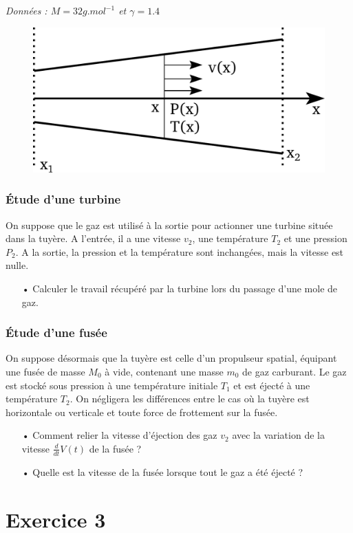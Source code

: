 \documentclass{report}
\begin{document}
\textit{Données : $M = 32g.mol^{-1}$ et $\gamma=1.4$}

\begin{figure}[!h]
\centering
\includegraphics[width=0.4\linewidth]{turbine.pdf}
\end{figure}

\subsubsection*{Étude d'une turbine}
On suppose que le gaz est utilisé à la sortie pour actionner une turbine située dans la tuyère. A l'entrée, il a une vitesse $v_{2}$, une température $T_{2}$ et une pression $P_{2}$. A la sortie, la pression et la température sont inchangées, mais la vitesse est nulle. 
\begin{itemize}
\item[•] Calculer le travail récupéré par la turbine lors du passage d'une mole de gaz.

\end{itemize}

\subsubsection*{Étude d'une fusée}

On suppose désormais que la tuyère est celle d'un propulseur spatial, équipant une fusée de masse $M_0$ à vide, contenant une masse $m_0$ de gaz carburant. Le gaz est stocké sous pression à une température initiale $T_1$ et est éjecté à une température $T_2$. On négligera les différences entre le cas où la tuyère est horizontale ou verticale et toute force de frottement sur la fusée. 

\begin{itemize}
	\item[•] Comment relier la vitesse d'éjection des gaz $v_2$ avec la variation de la vitesse $\frac{d}{dt} V(t)$ de la fusée ? 
	\item[•] Quelle est la vitesse de la fusée lorsque tout le gaz a été éjecté ?
\end{itemize}

\newpage

\section*{Exercice 3}
\end{document}
